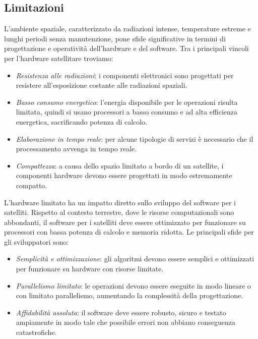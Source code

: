 \subsection{Limitazioni}

L'ambiente spaziale, caratterizzato da radiazioni intense, temperature estreme e lunghi periodi senza manutenzione, pone sfide significative in termini di progettazione e operatività dell'hardware e del software.
Tra i principali vincoli per l'hardware satellitare troviamo:

\begin{itemize}
    \item \textit{Resistenza alle radiazioni}: i componenti elettronici sono progettati per resistere all'esposizione costante alle radiazioni spaziali.
    \item \textit{Basso consumo energetico}: l'energia disponibile per le operazioni risulta limitata, quindi si usano processori a basso consumo e ad alta efficienza energetica, sacrificando potenza di calcolo.
    \item \textit{Elaborazione in tempo reale}: per alcune tipologie di servizi è necessario che il processamento avvenga in tempo reale.
    \item \textit{Compattezza}: a causa dello spazio limitato a bordo di un satellite, i componenti hardware devono essere progettati in modo estremamente compatto.
\end{itemize}

\noindent
L'hardware limitato ha un impatto diretto sullo sviluppo del software per i satelliti. 
Rispetto al contesto terrestre, dove le risorse computazionali sono abbondanti, il software per i satelliti deve essere ottimizzato per funzionare su processori con bassa potenza di calcolo e memoria ridotta. 
Le principali sfide per gli sviluppatori sono:

\begin{itemize}
    \item \textit{Semplicità e ottimizzazione}: gli algoritmi devono essere semplici e ottimiz\-zati per funzionare su hardware con risorse limitate.
    \item \textit{Parallelismo limitato}: le operazioni devono essere eseguite in modo lineare o con limitato parallelismo, aumentando la complessità della progettazione.
    \item \textit{Affidabilità assoluta}: il software deve essere robusto, sicuro e testato ampiamente in modo tale che possibile errori non abbiano conseguenza catastrofiche.
\end{itemize}

